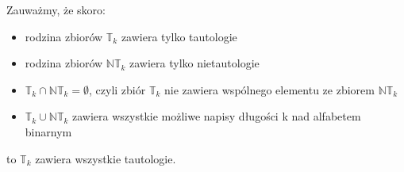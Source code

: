 Zauważmy, że skoro:
\begin{itemize}
	\item rodzina zbiorów $\mathbb{T}_{k}$ zawiera tylko tautologie
	\item rodzina zbiorów $\mathbb{NT}_{k}$ zawiera tylko nietautologie
	\item $\mathbb{T}_k \cap \mathbb{NT}_k = \emptyset$, czyli zbiór $\mathbb{T}_{k}$ nie zawiera wspólnego elementu ze zbiorem $\mathbb{NT}_{k}$
	\item $\mathbb{T}_k \cup \mathbb{NT}_k$ zawiera wszystkie możliwe napisy długości k nad alfabetem binarnym
\end{itemize}
to $\mathbb{T}_{k}$ zawiera wszystkie tautologie.